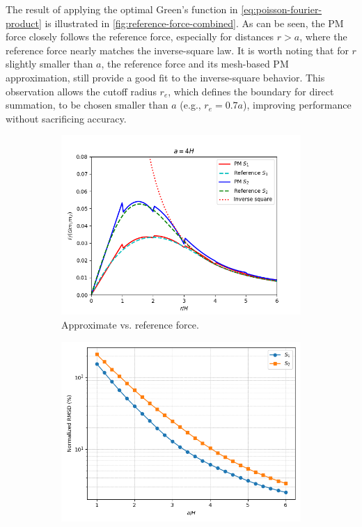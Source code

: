The result of applying the optimal Green's function in \autoref{eq:poisson-fourier-product} is illustrated in \autoref{fig:reference-force-combined}.
As can be seen, the PM force closely follows the reference force, especially for distances \( r > a \), where the reference force nearly matches the inverse-square law.
It is worth noting that for \( r \) slightly smaller than \( a \), the reference force and its mesh-based PM approximation, still provide a good fit to the inverse-square behavior.
This observation allows the cutoff radius \( r_e \), which defines the boundary for direct summation, to be chosen smaller than \( a \) (e.g., \( r_e = 0.7a \)), improving performance without sacrificing accuracy.
\begin{figure}[htp]
    \centering
    \begin{subfigure}[b]{0.48\textwidth}
        \centering
        \includegraphics[width=\textwidth]{img/p3m/s1-vs-s2.png}
        \caption{Approximate vs. reference force.}
        \label{fig:reference-force-approx-sub}
    \end{subfigure}
    \hfill
    \begin{subfigure}[b]{0.48\textwidth}
        \centering
        \includegraphics[width=\textwidth]{img/p3m/s1-vs-s2-nrmsd.png}

\end{subfigure}
\end{figure}
